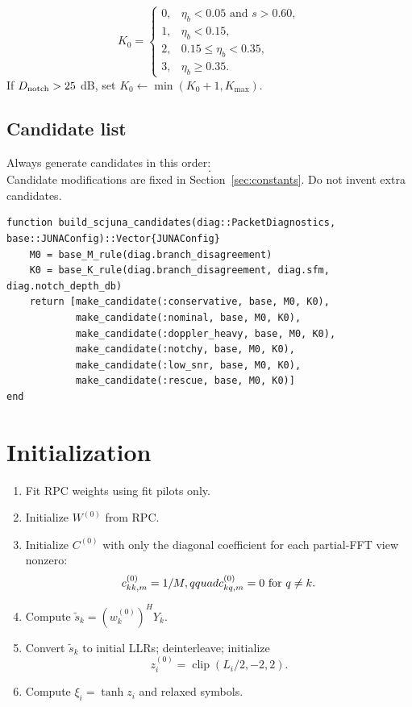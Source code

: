 \documentclass[11pt]{article}
\newcommand{\code}[1]{\texttt{\detokenize{#1}}}
\begin{document}
\begin{equation}
K_0=\begin{cases}
0,&\eta_b<0.05\text{ and }s>0.60,\\
1,&\eta_b<0.15,\\
2,&0.15\le\eta_b<0.35,\\
3,&\eta_b\ge0.35.
\end{cases}
\end{equation}
If $D_{\rm notch}>25$ dB, set $K_0\leftarrow\min(K_0+1,K_{\max})$.

\subsection{Candidate list}

Always generate candidates in this order:
\begin{equation}
[\code{conservative},\code{nominal},\code{doppler_heavy},\code{notchy},\code{low_snr},\code{rescue}].
\end{equation}
Candidate modifications are fixed in Section~\ref{sec:constants}. Do not invent extra candidates.

\begin{lstlisting}
function build_scjuna_candidates(diag::PacketDiagnostics, base::JUNAConfig)::Vector{JUNAConfig}
    M0 = base_M_rule(diag.branch_disagreement)
    K0 = base_K_rule(diag.branch_disagreement, diag.sfm, diag.notch_depth_db)
    return [make_candidate(:conservative, base, M0, K0),
            make_candidate(:nominal, base, M0, K0),
            make_candidate(:doppler_heavy, base, M0, K0),
            make_candidate(:notchy, base, M0, K0),
            make_candidate(:low_snr, base, M0, K0),
            make_candidate(:rescue, base, M0, K0)]
end
\end{lstlisting}

\section{Initialization}

\begin{enumerate}
\item Fit RPC weights using fit pilots only.
\item Initialize $W^{(0)}$ from RPC.
\item Initialize $C^{(0)}$ with only the diagonal coefficient for each partial-FFT view nonzero:
\begin{equation}
c_{kk,m}^{(0)}=1/M,\\qquad c_{kq,m}^{(0)}=0 \text{ for } q\ne k.
\end{equation}
\item Compute $\tilde s_k=(w_k^{(0)})^H Y_k$.
\item Convert $\tilde s_k$ to initial LLRs; deinterleave; initialize
\begin{equation}
z_i^{(0)}=\operatorname{clip}(L_i/2,-2,2).
\end{equation}
\item Compute $\xi_i=\tanh z_i$ and relaxed symbols.
\end{enumerate}
\end{document}
